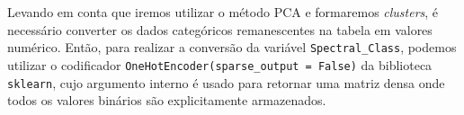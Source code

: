 Levando em conta que iremos utilizar o método PCA e formaremos \textit{clusters}, é necessário converter os dados categóricos remanescentes na tabela em valores numérico. Então, para realizar a conversão da variável \verb|Spectral_Class|, podemos utilizar o codificador \verb|OneHotEncoder(sparse_output = False)| da biblioteca \verb|sklearn|, cujo argumento interno é usado para retornar uma matriz densa onde todos os valores binários são explicitamente armazenados.
        

